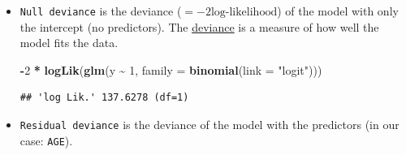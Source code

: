 \documentclass[
]{book}
\newenvironment{Shaded}{\begin{snugshade}}{\end{snugshade}}
\newcommand{\AttributeTok}[1]{\textcolor[rgb]{0.13,0.29,0.53}{#1}}
\newcommand{\DecValTok}[1]{\textcolor[rgb]{0.00,0.00,0.81}{#1}}
\newcommand{\FunctionTok}[1]{\textcolor[rgb]{0.13,0.29,0.53}{\textbf{#1}}}
\newcommand{\NormalTok}[1]{#1}
\newcommand{\SpecialCharTok}[1]{\textcolor[rgb]{0.81,0.36,0.00}{\textbf{#1}}}
\newcommand{\StringTok}[1]{\textcolor[rgb]{0.31,0.60,0.02}{#1}}
\begin{document}
\begin{itemize}
  If we want the \textbf{odds ratio}, we can just exponentiate:

  \[log(\frac{p_i}{1-p_i}) = \beta_0 + \beta_1 AGE\]
  \[\text{Odds for a 1 = } \frac{p_i}{1-p_i} = e^{\beta_0 + \beta_1 AGE} = e^{\beta_0} \cdot e^{\beta_1 AGE}\]

  If you add \(1\) to AGE:

  \[\text{Odds for a 1 with } (AGE + 1) = e^{\beta_0} \cdot e^{\beta_1 (AGE + 1)} = e^{\beta_0} \cdot e^{\beta_1 AGE} \cdot e^{\beta_1} = \text{Odds for a 1} \cdot e^{\beta_1}\]

  So, \textbf{on the odds scale}, you \textbf{multiply the odds for a \(1\) by \(e^{\beta_1}\)}.

  We can also work \textbf{directly on the probability scale}:
  The difference in the probability of a \(1\) for two participants with a
  difference of \(1\) year in their age is:

  \[
  \begin{aligned}
  \mathbb{P}(Y_i = 1 \mid AGE + 1) - \mathbb{P}(Y_i = 1 \mid AGE) 
  &= \operatorname{inv\_logit}(\beta_0 + \beta_1 (AGE + 1)) \\
  &\quad - \operatorname{inv\_logit}(\beta_0 + \beta_1 AGE)
  \end{aligned}
  \]

  This difference is not constant (see graph below, red line), but depends on the value of \(AGE\),
  since the inverse logit function is non-linear.
\item
  \texttt{Null\ deviance} is the deviance (\(= -2 \text{log-likelihood}\)) of
  the model with only the intercept (no predictors).
  The \href{https://en.wikipedia.org/wiki/Deviance_(statistics)}{deviance}
  is a measure of how well the model fits the data.

\begin{Shaded}
\begin{Highlighting}[]
\SpecialCharTok{{-}}\DecValTok{2} \SpecialCharTok{*} \FunctionTok{logLik}\NormalTok{(}\FunctionTok{glm}\NormalTok{(y }\SpecialCharTok{\textasciitilde{}} \DecValTok{1}\NormalTok{, }\AttributeTok{family =} \FunctionTok{binomial}\NormalTok{(}\AttributeTok{link =} \StringTok{"logit"}\NormalTok{)))}
\end{Highlighting}
\end{Shaded}

\begin{verbatim}
## 'log Lik.' 137.6278 (df=1)
\end{verbatim}
\item
  \texttt{Residual\ deviance} is the deviance of the model with the predictors (in our case: \texttt{AGE}).


\end{itemize}
\end{document}

